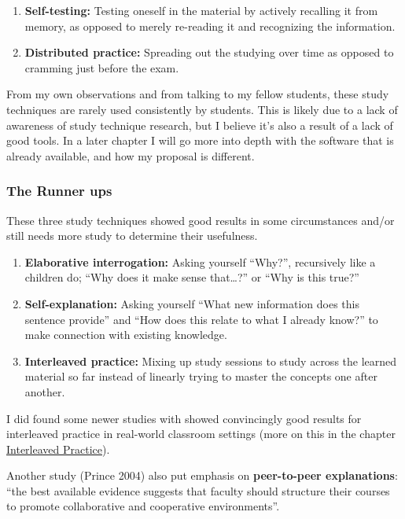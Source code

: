 \begin{enumerate}
\def\labelenumi{\arabic{enumi}.}
\tightlist
\item
  \textbf{Self-testing:} Testing oneself in the material by actively
  recalling it from memory, as opposed to merely re-reading it and
  recognizing the information.
\item
  \textbf{Distributed practice:} Spreading out the studying over time as
  opposed to cramming just before the exam.
\end{enumerate}

From my own observations and from talking to my fellow students, these
study techniques are rarely used consistently by students. This is
likely due to a lack of awareness of study technique research, but I
believe it's also a result of a lack of good tools. In a later chapter I
will go more into depth with the software that is already available, and
how my proposal is different.

\subsubsection{The Runner ups}\label{the-runner-ups}

These three study techniques showed good results in some circumstances
and/or still needs more study to determine their usefulness.

\begin{enumerate}
\def\labelenumi{\arabic{enumi}.}
\setcounter{enumi}{2}
\tightlist
\item
  \textbf{Elaborative interrogation:} Asking yourself ``Why?'',
  recursively like a children do; ``Why does it make sense
  that\ldots{}?'' or ``Why is this true?''
\item
  \textbf{Self-explanation:} Asking yourself ``What new information does
  this sentence provide'' and ``How does this relate to what I already
  know?'' to make connection with existing knowledge.
\item
  \textbf{Interleaved practice:} Mixing up study sessions to study
  across the learned material so far instead of linearly trying to
  master the concepts one after another.
\end{enumerate}

I did found some newer studies with showed convincingly good results for
interleaved practice in real-world classroom settings (more on this in
the chapter \protect\hyperlink{interleaved-practice}{Interleaved
Practice}).

Another study (Prince 2004) also put emphasis on \textbf{peer-to-peer
explanations}: ``the best available evidence suggests that faculty
should structure their courses to promote collaborative and cooperative
environments''.

